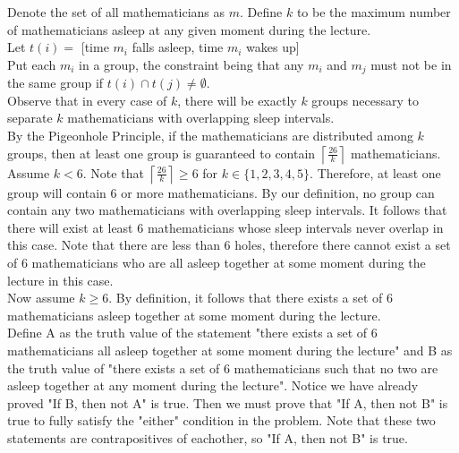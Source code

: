 \documentclass[11pt, letterpaper]{article}
\begin{document}
\begin{solution}{4}

Denote the set of all mathematicians as $m$. Define $k$ to be the maximum number of mathematicians asleep at any given moment during the lecture.\\

Let $t(i) =$ [time $m_i$ falls asleep, time $m_i$ wakes up]\\

Put each $m_i$ in a group, the constraint being that any $m_i$ and $m_j$ must not be in the same group if $t(i) \cap t(j) \neq \emptyset$.\\

Observe that in every case of $k$, there will be exactly $k$ groups necessary to separate $k$ mathematicians with overlapping sleep intervals.\\

By the Pigeonhole Principle, if the mathematicians are distributed among $k$ groups, then at least one group is guaranteed to contain $\left\lceil{\frac{26}{k}}\right\rceil$ mathematicians.\\

Assume $k < 6$. Note that $\left\lceil{\frac{26}{k}}\right\rceil \ge 6$ for $k \in \{1,2,3,4,5\}$. Therefore, at least one group will contain 6 or more mathematicians. By our definition, no group can contain any two mathematicians with overlapping sleep intervals. It follows that there will exist at least 6 mathematicians whose sleep intervals never overlap in this case. Note that there are less than 6 holes, therefore there cannot exist a set of 6 mathematicians who are all asleep together at some moment during the lecture in this case.\\ 

Now assume $k \ge 6$. By definition, it follows that there exists a set of 6 mathematicians asleep together at some moment during the lecture. \\

Define A as the truth value of the statement "there exists a set of 6 mathematicians all asleep together at some moment during the lecture" and B as the truth value of "there exists a set of 6 mathematicians such that no two are asleep together at any moment during the lecture". Notice we have already proved "If B, then not A" is true. Then we must prove that "If A, then not B" is true to fully satisfy the "either" condition in the problem. Note that these two statements are contrapositives of eachother, so "If A, then not B" is true. \\


\end{solution}
\end{document}
